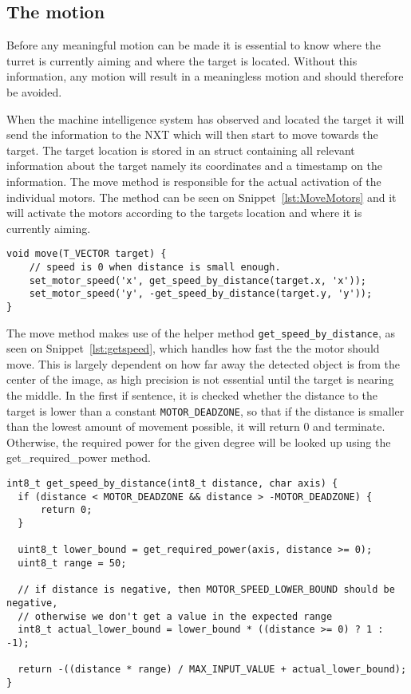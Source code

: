 \subsection{The motion}
Before any meaningful motion can be made it is essential to know where the turret is currently aiming and where the target is located.
Without this information, any motion will result in a meaningless motion and should therefore be avoided.

When the machine intelligence system has observed and located the target it will send the information to the NXT which will then start to move towards the target.
The target location is stored in an struct containing all relevant information about the target namely its coordinates and a timestamp on the information.
The move method is responsible for the actual activation of the individual motors.
The method can be seen on Snippet~\ref{lst:MoveMotors} and it will activate the motors according to the targets location and where it is currently aiming.
\begin{lstlisting}[language=CSharp,caption={move method from movement.c},label={lst:MoveMotors}]
  void move(T_VECTOR target) {
    // speed is 0 when distance is small enough.
    set_motor_speed('x', get_speed_by_distance(target.x, 'x'));
    set_motor_speed('y', -get_speed_by_distance(target.y, 'y'));
}
\end{lstlisting}

The move method makes use of the helper method \texttt{get\_speed\_by\_distance}, as seen on Snippet~\ref{lst:getspeed}, which handles how fast the the motor should move.
This is largely dependent on how far away the detected object is from the center of the image, as high precision is not essential until the target is nearing the middle.
In the first if sentence, it is checked whether the distance to the target is lower than a constant \texttt{MOTOR_DEADZONE}, so that if the distance is smaller than the lowest amount of movement possible, it will return 0 and terminate.
Otherwise, the required power for the given degree will be looked up using the get\_required\_power method.

\begin{lstlisting}[language=CSharp,caption={get\_speed\_by\_distance method from movement.c},label={lst:getspeed}]
int8_t get_speed_by_distance(int8_t distance, char axis) {
  if (distance < MOTOR_DEADZONE && distance > -MOTOR_DEADZONE) {
      return 0;
  }

  uint8_t lower_bound = get_required_power(axis, distance >= 0);
  uint8_t range = 50;

  // if distance is negative, then MOTOR_SPEED_LOWER_BOUND should be negative,
  // otherwise we don't get a value in the expected range
  int8_t actual_lower_bound = lower_bound * ((distance >= 0) ? 1 : -1);

  return -((distance * range) / MAX_INPUT_VALUE + actual_lower_bound);
}
\end{lstlisting}

